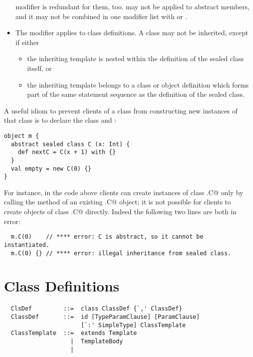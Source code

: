 \documentclass[a4paper,12pt,twoside,titlepage]{book}
\begin{document}
\begin{itemize}
 modifier is redundant for them, too.   may
not be applied to abstract members, and it may not be combined in one
modifier list with  or .
\item
The  modifier applies to class definitions. A
 class may not be inherited, except if either
\begin{itemize}
\item
the inheriting template is nested within the definition of the sealed
class itself, or
\item
the inheriting template belongs to a class or object definition which
forms part of the same statement sequence as the definition of the
sealed class.
\end{itemize}
\end{itemize}

\example A useful idiom to prevent clients of a class from
constructing new instances of that class is to declare the class
 and :

\begin{lstlisting}
object m {
  abstract sealed class C (x: Int) {
    def nextC = C(x + 1) with {}
  }
  val empty = new C(0) {}
}
\end{lstlisting}
For instance, in the code above clients can create instances of class
\lstinline@m.C@ only by calling the  method of an existing \lstinline@m.C@
object; it is not possible for clients to create objects of class
\lstinline@m.C@ directly. Indeed the following two lines are both in error:

\begin{lstlisting}
  m.C(0)    // **** error: C is abstract, so it cannot be instantiated.
  m.C(0) {} // **** error: illegal inheritance from sealed class.
\end{lstlisting}

\section{Class Definitions}
\label{sec:classes}

\syntax\begin{lstlisting}
  ClsDef         ::=  class ClassDef {`,' ClassDef}
  ClassDef       ::=  id [TypeParamClause] [ParamClause] 
                      [`:' SimpleType] ClassTemplate
  ClassTemplate  ::=  extends Template
                   |  TemplateBody
                   |
\end{lstlisting}
\end{document}
